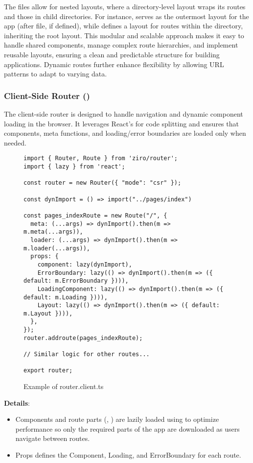 The  files allow for nested layouts, where a directory-level layout wraps its routes and those in child directories. For instance,  serves as the outermost layout for the app (after  file, if defined), while  defines a layout for routes within the  directory, inheriting the root layout. This modular and scalable approach makes it easy to handle shared components, manage complex route hierarchies, and implement reusable layouts, ensuring a clean and predictable structure for building applications. Dynamic routes further enhance flexibility by allowing URL patterns to adapt to varying data.



\subsubsection{Client-Side Router ()}
The client-side router is designed to handle navigation and dynamic component loading in the browser. It leverages React’s  for code splitting and ensures that components, meta functions, and loading/error boundaries are loaded only when needed.

\begin{figure}[H]
\begin{verbatim}
import { Router, Route } from 'ziro/router';
import { lazy } from 'react';

const router = new Router({ "mode": "csr" });

const dynImport = () => import("../pages/index")

const pages_indexRoute = new Route("/", {
  meta: (...args) => dynImport().then(m => m.meta(...args)),
  loader: (...args) => dynImport().then(m => m.loader(...args)),
  props: {
    component: lazy(dynImport),
    ErrorBoundary: lazy(() => dynImport().then(m => ({ default: m.ErrorBoundary }))),
    LoadingComponent: lazy(() => dynImport().then(m => ({ default: m.Loading }))),
    Layout: lazy(() => dynImport().then(m => ({ default: m.Layout }))),
  },
});
router.addroute(pages_indexRoute);

// Similar logic for other routes...

export router;
\end{verbatim}
\caption{Example of router.client.ts}
\end{figure}

\textbf{Details}:
\begin{itemize}
  \item Components and route parts (, ) are lazily loaded using  to optimize performance so only the required parts of the app are downloaded as users navigate between routes.
  \item Props defines the Component, Loading, and ErrorBoundary for each route.
\end{itemize}

